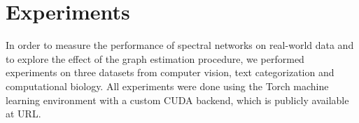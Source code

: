 %
%
%
%
%
%
%
%
%
%
%
%
%
%

\section{Experiments}

In order to measure the performance of spectral networks on real-world data and to explore the effect of the graph estimation procedure, we performed experiments on three datasets from computer vision, text categorization and computational biology. All experiments were done using the Torch machine learning environment with a custom CUDA backend, which is publicly available at URL.

